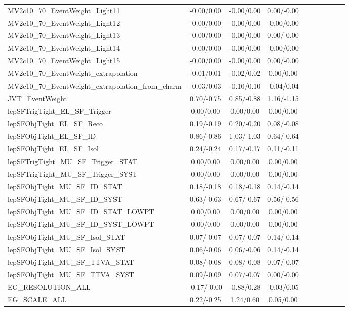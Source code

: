 \begin{table}[h]
\begin{center}
\begin{tabular}{l|ccccccccc}
MV2c10\_70\_EventWeight\_Light11 &-0.00/0.00 &-0.00/0.00 &0.00/-0.00 \\
MV2c10\_70\_EventWeight\_Light12 &-0.00/0.00 &-0.00/0.00 &-0.00/0.00 \\
MV2c10\_70\_EventWeight\_Light13 &-0.00/0.00 &-0.00/0.00 &0.00/-0.00 \\
MV2c10\_70\_EventWeight\_Light14 &-0.00/0.00 &-0.00/0.00 &-0.00/0.00 \\
MV2c10\_70\_EventWeight\_Light15 &-0.00/0.00 &-0.00/0.00 &0.00/-0.00 \\
MV2c10\_70\_EventWeight\_extrapolation &-0.01/0.01 &-0.02/0.02 &0.00/0.00 \\
MV2c10\_70\_EventWeight\_extrapolation\_from\_charm &-0.03/0.03 &-0.10/0.10 &-0.04/0.04 \\
JVT\_EventWeight &0.70/-0.75 &0.85/-0.88 &1.16/-1.15 \\
lepSFTrigTight\_EL\_SF\_Trigger &0.00/0.00 &0.00/0.00 &0.00/0.00 \\
lepSFObjTight\_EL\_SF\_Reco &0.19/-0.19 &0.20/-0.20 &0.08/-0.08 \\
lepSFObjTight\_EL\_SF\_ID &0.86/-0.86 &1.03/-1.03 &0.64/-0.64 \\
lepSFObjTight\_EL\_SF\_Isol &0.24/-0.24 &0.17/-0.17 &0.11/-0.11 \\
lepSFTrigTight\_MU\_SF\_Trigger\_STAT &0.00/0.00 &0.00/0.00 &0.00/0.00 \\
lepSFTrigTight\_MU\_SF\_Trigger\_SYST &0.00/0.00 &0.00/0.00 &0.00/0.00 \\
lepSFObjTight\_MU\_SF\_ID\_STAT &0.18/-0.18 &0.18/-0.18 &0.14/-0.14 \\
lepSFObjTight\_MU\_SF\_ID\_SYST &0.63/-0.63 &0.67/-0.67 &0.56/-0.56 \\
lepSFObjTight\_MU\_SF\_ID\_STAT\_LOWPT &0.00/0.00 &0.00/0.00 &0.00/0.00 \\
lepSFObjTight\_MU\_SF\_ID\_SYST\_LOWPT &0.00/0.00 &0.00/0.00 &0.00/0.00 \\
lepSFObjTight\_MU\_SF\_Isol\_STAT &0.07/-0.07 &0.07/-0.07 &0.14/-0.14 \\
lepSFObjTight\_MU\_SF\_Isol\_SYST &0.06/-0.06 &0.06/-0.06 &0.14/-0.14 \\
lepSFObjTight\_MU\_SF\_TTVA\_STAT &0.08/-0.08 &0.08/-0.08 &0.07/-0.07 \\
lepSFObjTight\_MU\_SF\_TTVA\_SYST &0.09/-0.09 &0.07/-0.07 &0.00/-0.00 \\
EG\_RESOLUTION\_ALL &-0.17/-0.00 &-0.88/0.28 &-0.03/0.05 \\
EG\_SCALE\_ALL &0.22/-0.25 &1.24/0.60 &0.05/0.00 \\

\end{tabular}
\end{center}
\end{table}
